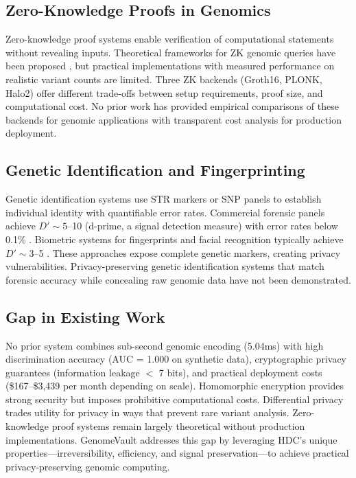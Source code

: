 \documentclass[11pt,letterpaper]{article}
\begin{document}
\subsection{Zero-Knowledge Proofs in Genomics}

Zero-knowledge proof systems enable verification of computational statements without revealing inputs. Theoretical frameworks for ZK genomic queries have been proposed \cite{bogatyy2020,demmler2019}, but practical implementations with measured performance on realistic variant counts are limited. Three ZK backends (Groth16, PLONK, Halo2) offer different trade-offs between setup requirements, proof size, and computational cost. No prior work has provided empirical comparisons of these backends for genomic applications with transparent cost analysis for production deployment.

\subsection{Genetic Identification and Fingerprinting}

Genetic identification systems use STR markers or SNP panels to establish individual identity with quantifiable error rates. Commercial forensic panels achieve $D' \sim 5$--10 (d-prime, a signal detection measure) with error rates below 0.1\% \cite{butler2015}. Biometric systems for fingerprints and facial recognition typically achieve $D' \sim 3$--5 \cite{phillips2018}. These approaches expose complete genetic markers, creating privacy vulnerabilities. Privacy-preserving genetic identification systems that match forensic accuracy while concealing raw genomic data have not been demonstrated.

\subsection{Gap in Existing Work}

No prior system combines sub-second genomic encoding (5.04ms) with high discrimination accuracy (AUC = 1.000 on synthetic data), cryptographic privacy guarantees (information leakage $<$ 7 bits), and practical deployment costs (\$167--\$3,439 per month depending on scale). Homomorphic encryption provides strong security but imposes prohibitive computational costs. Differential privacy trades utility for privacy in ways that prevent rare variant analysis. Zero-knowledge proof systems remain largely theoretical without production implementations. GenomeVault addresses this gap by leveraging HDC's unique properties---irreversibility, efficiency, and signal preservation---to achieve practical privacy-preserving genomic computing.
\end{document}
